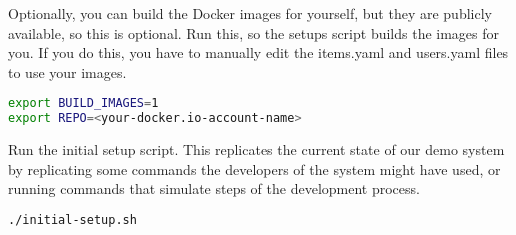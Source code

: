 Optionally, you can build the Docker images for yourself, but they are publicly available, so this is optional. Run this, so the setups script builds the images for you. If you do this, you have to manually edit the items.yaml and users.yaml files to use your images.

\begin{lstlisting}[caption={Optional: Build images},language=bash,label=code:bash1]
export BUILD_IMAGES=1
export REPO=<your-docker.io-account-name>
\end{lstlisting}

Run the initial setup script. This replicates the current state of our demo system by replicating some commands the developers of the system might have used, or running commands that simulate steps of the development process.

\begin{lstlisting}[caption={Run the setup script},language=bash,label=code:bash2]
./initial-setup.sh
\end{lstlisting}


